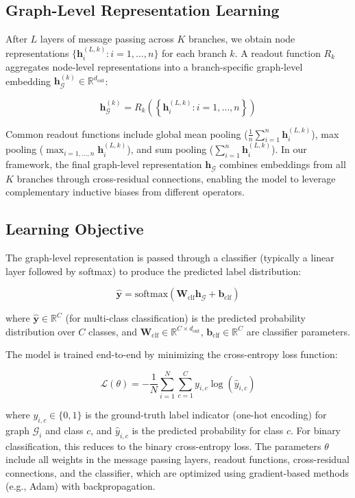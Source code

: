 \subsection{Graph-Level Representation Learning}

After $L$ layers of message passing across $K$ branches, we obtain node representations $\{\mathbf{h}_i^{(L, k)} : i = 1, \ldots, n\}$ for each branch $k$. A readout function $R_k$ aggregates node-level representations into a branch-specific graph-level embedding $\mathbf{h}_{\mathcal{G}}^{(k)} \in \mathbb{R}^{d_{\text{out}}}$:

\begin{equation}
\mathbf{h}_{\mathcal{G}}^{(k)} = R_k\left(\left\{\mathbf{h}_i^{(L, k)} : i = 1, \ldots, n\right\}\right)
\end{equation}

Common readout functions include global mean pooling ($\frac{1}{n}\sum_{i=1}^n \mathbf{h}_i^{(L, k)}$), max pooling ($\max_{i=1,\ldots,n} \mathbf{h}_i^{(L, k)}$), and sum pooling ($\sum_{i=1}^n \mathbf{h}_i^{(L, k)}$). In our framework, the final graph-level representation $\mathbf{h}_{\mathcal{G}}$ combines embeddings from all $K$ branches through cross-residual connections, enabling the model to leverage complementary inductive biases from different operators.

\subsection{Learning Objective}

The graph-level representation is passed through a classifier (typically a linear layer followed by softmax) to produce the predicted label distribution:

\begin{equation}
\hat{\mathbf{y}} = \text{softmax}\left(\mathbf{W}_{\text{clf}} \mathbf{h}_{\mathcal{G}} + \mathbf{b}_{\text{clf}}\right)
\end{equation}

where $\hat{\mathbf{y}} \in \mathbb{R}^{C}$ (for multi-class classification) is the predicted probability distribution over $C$ classes, and $\mathbf{W}_{\text{clf}} \in \mathbb{R}^{C \times d_{\text{out}}}$, $\mathbf{b}_{\text{clf}} \in \mathbb{R}^{C}$ are classifier parameters.

The model is trained end-to-end by minimizing the cross-entropy loss function:

\begin{equation}
\mathcal{L}(\theta) = -\frac{1}{N} \sum_{i=1}^{N} \sum_{c=1}^{C} y_{i,c} \log(\hat{y}_{i,c})
\end{equation}

where $y_{i,c} \in \{0, 1\}$ is the ground-truth label indicator (one-hot encoding) for graph $\mathcal{G}_i$ and class $c$, and $\hat{y}_{i,c}$ is the predicted probability for class $c$. For binary classification, this reduces to the binary cross-entropy loss. The parameters $\theta$ include all weights in the message passing layers, readout functions, cross-residual connections, and the classifier, which are optimized using gradient-based methods (e.g., Adam) with backpropagation.
